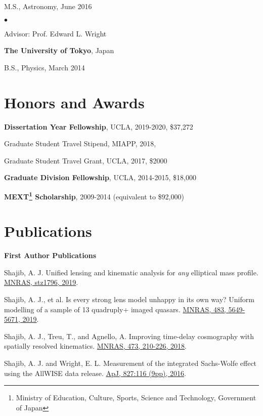 \documentclass[margin, line]{res}
\newenvironment{list1}{
  \begin{list}{\ding{113}}{%
      \setlength{\itemsep}{0in}
      \setlength{\parsep}{0in} \setlength{\parskip}{0in}
      \setlength{\topsep}{0in} \setlength{\partopsep}{0in} 
      \setlength{\leftmargin}{0.17in}}}{\end{list}}
\newenvironment{list2}{
  \begin{list}{$\bullet$}{%
      \setlength{\itemsep}{0in}
      \setlength{\parsep}{0in} \setlength{\parskip}{0in}
      \setlength{\topsep}{0in} \setlength{\partopsep}{0in} 
      \setlength{\leftmargin}{0.2in}}}{\end{list}}
\begin{document}
\begin{resume}
\begin{list1}
	\item[] M.S., Astronomy,  June 2016
	\begin{list2}
		\vspace*{.05in} 
		\item Advisor:  Prof. Edward L. Wright
	\end{list2}
\end{list1}

{\bf The University of Tokyo}, Japan\\
\vspace*{-.1in}
\begin{list1}
\item[] B.S., Physics,  March 2014
\end{list1}


\section{\sc Honors and Awards}
\textbf{Dissertation Year Fellowship}, UCLA, 2019-2020, \$37,272

\vspace*{-2.5mm}
Graduate Student Travel Stipend, {MIAPP}, 2018, 

\vspace*{-2.5mm}
Graduate Student Travel Grant, {UCLA}, 2017, \$2000

\vspace*{-2.5mm}
\textbf{Graduate Division Fellowship}, UCLA, 2014-2015, \$18,000

\vspace*{-2.5mm}
\textbf{MEXT\footnote{Ministry of Education, Culture, Sports, Science and Technology, Government of Japan} Scholarship}, 2009-2014 (equivalent to \$92,000)


\section{\sc Publications}
\textbf{First Author Publications} \\
\begin{etaremune}
	\item {Shajib, A. J.} Unified lensing and kinematic analysis for \textit{any} elliptical mass profile. \\ \href{https://doi.org/10.1093/mnras/stz1796}{MNRAS, stz1796, 2019}.
	\item {Shajib, A. J.}, et al. Is every strong lens model unhappy in its own way? Uniform modelling of a sample of 13 quadruply+ imaged quasars. \href{https://doi.org/10.1093/mnras/sty3397}{MNRAS, 483, 5649-5671, 2019}.
	\item {Shajib, A. J.}, Treu, T., and Agnello, A. Improving time-delay cosmography with spatially resolved kinematics. \href{https://doi.org/10.1093/mnras/stx2302}{MNRAS, 473, 210-226, 2018}.
	\item {Shajib, A. J.} and Wright, E. L. Measurement of the integrated Sachs-Wolfe effect using the AllWISE data release. \href{http://dx.doi.org/10.3847/0004-637X/827/2/116}{ApJ, 827:116 (9pp), 2016}.
\end{etaremune}



\end{resume}
\end{document}
